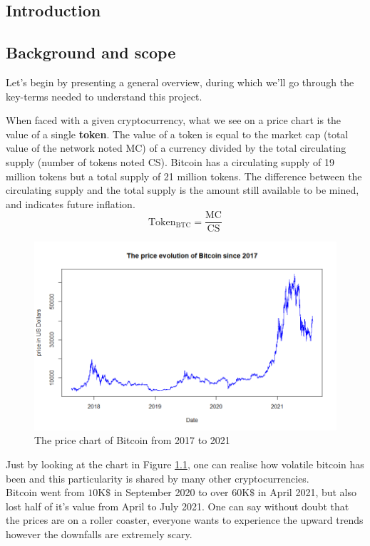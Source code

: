 \documentclass[twoside]{report}
\date{June 2021}
\begin{document}
\begin{spacing}{1}

\selectfont
\tableofcontents




\chapter{Introduction}

\section{Background and scope}
Let's begin by presenting a general overview, during which we'll go through the key-terms needed to understand this project.

When faced with a given cryptocurrency, what we see on a price chart is the value of a single \textbf{token}.
The value of a token is equal to the market cap (total value of the network noted MC) of a currency divided by the total circulating supply (number of tokens noted CS).
Bitcoin has a circulating supply of 19 million tokens but a total supply of 21 million tokens. The difference between the circulating supply and the total supply is the amount still available to be mined, and indicates future inflation. 
$$\text{Token}_\text{BTC}=\frac{\text{MC}}{\text{CS}}$$
\begin{figure}[!htbp]
    \centering
    \includegraphics[scale = 0.7]{TestPlots/BTC_overview.png}
    \caption{The price chart of Bitcoin from 2017 to 2021}
    \label{BTC overall}
\end{figure}

Just by looking at the chart in Figure \ref{BTC overall}, one can realise how volatile bitcoin has been and this particularity is shared by many other cryptocurrencies.\\
Bitcoin went from $10\text{K}\$$ in September 2020 to over $60\text{K}\$$ in April 2021, but also lost half of it's value from April to July 2021.
One can say without doubt that the prices are on a roller coaster, everyone wants to experience the upward trends however the downfalls are extremely scary.\\


\end{spacing}
\end{document}
